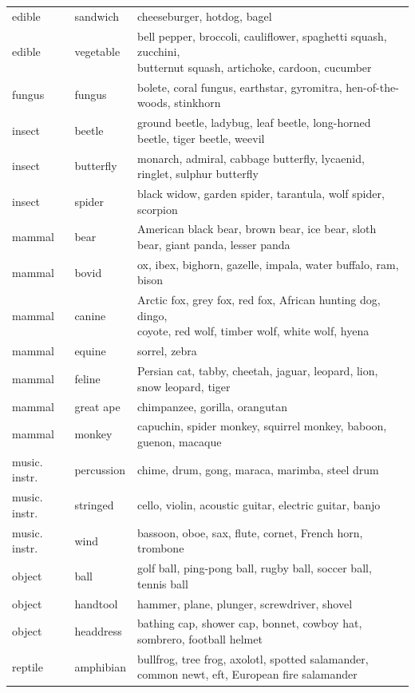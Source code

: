 \begin{table}
\begin{tabular}{lll}
edible & sandwich & cheeseburger, hotdog, bagel \\
edible & vegetable & \makecell[l]{bell pepper, broccoli, cauliflower, spaghetti squash, zucchini, \\butternut squash, artichoke, cardoon, cucumber} \\
\midrule
fungus & fungus & bolete, coral fungus, earthstar, gyromitra, hen-of-the-woods, stinkhorn \\
\midrule
insect & beetle & ground beetle, ladybug, leaf beetle, long-horned beetle, tiger beetle, weevil \\
insect & butterfly & monarch, admiral, cabbage butterfly, lycaenid, ringlet, sulphur butterfly \\
insect & spider & black widow, garden spider, tarantula, wolf spider, scorpion \\
\midrule
mammal & bear & American black bear, brown bear, ice bear, sloth bear, giant panda, lesser panda \\
mammal & bovid & ox, ibex, bighorn, gazelle, impala, water buffalo, ram, bison \\
mammal & canine & \makecell[l]{Arctic fox, grey fox, red fox, African hunting dog, dingo, \\coyote, red wolf, timber wolf, white wolf, hyena} \\
mammal & equine & sorrel, zebra \\
mammal & feline & Persian cat, tabby, cheetah, jaguar, leopard, lion, snow leopard, tiger \\
mammal & great ape & chimpanzee, gorilla, orangutan \\
mammal & monkey & capuchin, spider monkey, squirrel monkey, baboon, guenon, macaque \\
\midrule
music. instr. & percussion & chime, drum, gong, maraca, marimba, steel drum \\
music. instr. & stringed & cello, violin, acoustic guitar, electric guitar, banjo \\
music. instr. & wind & bassoon, oboe, sax, flute, cornet, French horn, trombone \\
\midrule
object & ball & golf ball, ping-pong ball, rugby ball, soccer ball, tennis ball \\
object & handtool & hammer, plane, plunger, screwdriver, shovel \\
object & headdress & bathing cap, shower cap, bonnet, cowboy hat, sombrero, football helmet \\
\midrule
reptile & amphibian & bullfrog, tree frog, axolotl, spotted salamander, common newt, eft, European fire salamander \\

\end{tabular}
\end{table}

